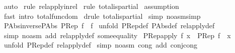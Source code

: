 \begin{isabellebody}
\isamarkupfalse%
\ auto\isanewline
{}\isamarkupfalse%
\ {\isacharparenleft}rule\ rel{\isacharunderscore}apply{\isacharunderscore}in{\isacharunderscore}rel{\isacharparenright}\isanewline
{}\isamarkupfalse%
\ {\isacharparenleft}rule\ total{\isacharunderscore}is{\isacharunderscore}partial{\isacharparenright}\isanewline
{}\isamarkupfalse%
\ assumption\isanewline
{}\isamarkupfalse%
\ {\isacharparenleft}fast\ intro{\isacharcolon}\ total{\isacharunderscore}func{\isacharunderscore}dom{\isacharparenright}\isanewline
{}\isamarkupfalse%
\ {\isacharparenleft}drule\ total{\isacharunderscore}is{\isacharunderscore}partial{\isacharparenright}\isanewline
{}\isamarkupfalse%
\ {\isacharparenleft}simp\ {\isacharparenleft}no{\isacharunderscore}asm{\isacharunderscore}simp{\isacharparenright}{\isacharparenright}\isanewline
{}\isamarkupfalse%
%
\endisatagproof
{\isafoldproof}%
%
\isadelimproof
\isanewline
%
\endisadelimproof
\isanewline
\isanewline
{}\isamarkupfalse%
\ PAbs{\isacharunderscore}inverse{\isacharcolon}{\isachardoublequoteopen}{\isacharparenleft}PAbs\ {\isacharparenleft}PRep\ f{\isacharparenright}{\isacharparenright}\ {\isacharequal}\ f{\isachardoublequoteclose}\isanewline
%
\isadelimproof
%
\endisadelimproof
%
\isatagproof
{}\isamarkupfalse%
\ {\isacharparenleft}unfold\ PRep{\isacharunderscore}def\ PAbs{\isacharunderscore}def\ rel{\isacharunderscore}apply{\isacharunderscore}def{\isacharparenright}\isanewline
{}\isamarkupfalse%
\ {\isacharparenleft}simp\ {\isacharparenleft}no{\isacharunderscore}asm{\isacharparenright}\ add{\isacharcolon}\ rel{\isacharunderscore}apply{\isacharunderscore}def\ some{\isacharunderscore}equality{\isacharparenright}\isanewline
{}\isamarkupfalse%
%
\endisatagproof
{\isafoldproof}%
%
\isadelimproof
\isanewline
%
\endisadelimproof
\isanewline
{}\isamarkupfalse%
\ PRep{\isacharunderscore}apply{\isacharcolon}\ {\isachardoublequoteopen}{\isacharparenleft}f\ x{\isacharparenright}\ {\isacharequal}\ {\isacharparenleft}{\isacharparenleft}PRep\ f{\isacharparenright}\ {\isacharpercent}{\isacharcircum}\ x{\isacharparenright}{\isachardoublequoteclose}\isanewline
%
\isadelimproof
%
\endisadelimproof
%
\isatagproof
{}\isamarkupfalse%
\ {\isacharparenleft}unfold\ PRep{\isacharunderscore}def\ rel{\isacharunderscore}apply{\isacharunderscore}def{\isacharparenright}\isanewline
{}\isamarkupfalse%
\ {\isacharparenleft}simp\ {\isacharparenleft}no{\isacharunderscore}asm{\isacharparenright}\ cong\ add{\isacharcolon}\ conj{\isacharunderscore}cong{\isacharparenright}\isanewline

\end{isabellebody}
